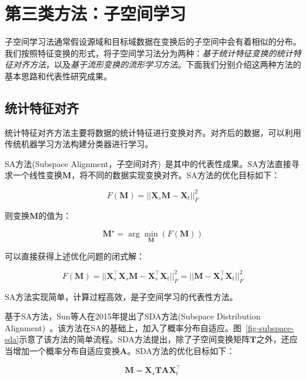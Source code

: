 \newpage
\section{第三类方法：子空间学习}

子空间学习法通常假设源域和目标域数据在变换后的子空间中会有着相似的分布。我们按照特征变换的形式，将子空间学习法分为两种：\textit{基于统计特征变换的统计特征对齐方法}，以及\textit{基于流形变换的流形学习方法}。下面我们分别介绍这两种方法的基本思路和代表性研究成果。

\subsection{统计特征对齐}

统计特征对齐方法主要将数据的统计特征进行变换对齐。对齐后的数据，可以利用传统机器学习方法构建分类器进行学习。

SA方法(Subspace Alignment，子空间对齐)~\cite{fernando2013unsupervised}是其中的代表性成果。SA方法直接寻求一个线性变换$\mathbf{M}$，将不同的数据实现变换对齐。SA方法的优化目标如下：

\begin{equation}
	F(\mathbf{M}) = ||\mathbf{X}_s \mathbf{M} - \mathbf{X}_t||^2_F
\end{equation}

则变换$\mathbf{M}$的值为：

\begin{equation}
	\mathbf{M}^\star = \arg \min_\mathbf{M} (F(\mathbf{M}))
\end{equation}

可以直接获得上述优化问题的闭式解：

\begin{equation}
	F(\mathbf{M}) = ||\mathbf{X}^\top_s \mathbf{X}_s \mathbf{M} - \mathbf{X}^\top_s \mathbf{X}_t||^2_F = ||\mathbf{M} - \mathbf{X}^\top_s \mathbf{X}_t||^2_F
\end{equation}

SA方法实现简单，计算过程高效，是子空间学习的代表性方法。

基于SA方法，Sun等人在2015年提出了SDA方法(Subspace Distribution Alignment)~\cite{sun2015subspace}。该方法在SA的基础上，加入了概率分布自适应。图~\ref{fig-subspace-sda}示意了该方法的简单流程。SDA方法提出，除了子空间变换矩阵$\mathbf{T}$之外，还应当增加一个概率分布自适应变换$\mathbf{A}$。SDA方法的优化目标如下：

\begin{equation}
	\mathbf{M} = \mathbf{X}_s \mathbf{T} \mathbf{A} \mathbf{X}^\top_t
\end{equation}

